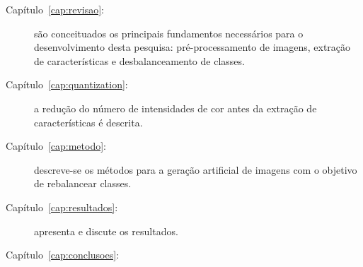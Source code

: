 \begin{description}
\item [Capítulo~\ref{cap:revisao}:] são conceituados os principais fundamentos necessários para o desenvolvimento desta pesquisa: pré-processamento de imagens, extração de características e desbalanceamento de classes.

\item [Capítulo~\ref{cap:quantization}:] a redução do número de intensidades de cor antes da extração de características é descrita.

\item [Capítulo~\ref{cap:metodo}:] descreve-se os métodos para a geração artificial de imagens com o objetivo de rebalancear classes.

\item [Capítulo~\ref{cap:resultados}:] apresenta e discute os resultados.

\item [Capítulo~\ref{cap:conclusoes}:]

\end{description}

